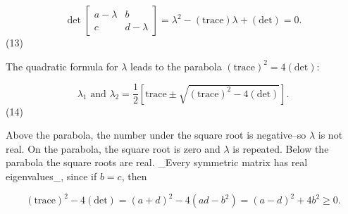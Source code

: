 \[\det\begin{bmatrix}a-\lambda&b\\ c&d-\lambda\end{bmatrix}=\lambda^{2}-(\mathrm{trace})\lambda+(\mathrm{det})=0.\] (13)

The quadratic formula for \(\lambda\) leads to the parabola \((\mathrm{trace})^{2}=4(\mathrm{det})\):

\[\lambda_{1}\text{ and }\lambda_{2}=\frac{1}{2}\left[\mathrm{trace}\pm\sqrt{( \mathrm{trace})^{2}-4(\mathrm{det})}\right].\] (14)

Above the parabola, the number under the square root is negative--so \(\lambda\) is not real. On the parabola, the square root is zero and \(\lambda\) is repeated. Below the parabola the square roots are real. _Every symmetric matrix has real eigenvalues_, since if \(b=c\), then

\[(\mathrm{trace})^{2}-4(\mathrm{det})=(a+d)^{2}-4(ad-b^{2})=(a-d)^{2}+4b^{2} \geq 0.\] 